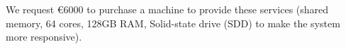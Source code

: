 \begin{workpackage}
\begin{tasklist}
\begin{task}[lead=USO,id=oommf-nb-ve,title=Online portal for
  micromagnetic VRE demonstrator,PM=3,partners={SR,JU},wphases=21-24]
  We request \euro{6000} to purchase a machine to provide these
  services (shared memory, 64 cores, 128GB RAM, Solid-state drive (SDD)
  to make the system more responsive).
\end{task}



%
%
%
%
\end{tasklist}


\end{workpackage}
